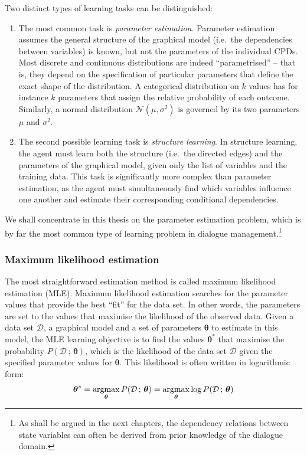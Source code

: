 Two distinct types of learning tasks can be distinguished:
\begin{enumerate}
\item The most common task is \textit{parameter estimation}.  Parameter estimation assumes the general structure of the graphical model (i.e.\ the dependencies between variables) is known, but not the parameters of the individual CPDs. Most discrete and continuous distributions are indeed ``parametrised'' -- that is, they depend on the specification of particular parameters that define the exact shape of the distribution. A categorical distribution on $k$ values has for instance $k$ parameters that assign the relative probability of each outcome.  Similarly, a normal distribution $\mathcal{N}(\mu,\sigma^2)$ is governed by its two parameters $\mu$ and $\sigma^2$. 

\item The second possible learning task is \textit{structure learning}.  In structure learning, the agent must learn both the structure (i.e.\ the directed edges) and the parameters of the graphical model, given only the list of variables and the training data.  This task is significantly more complex than parameter estimation, as the agent must simultaneously find which variables influence one another and estimate their corresponding conditional dependencies. 
\end{enumerate}

We shall concentrate in this thesis on the parameter estimation problem, which is by far the most common type of learning problem in dialogue management.\footnote{As shall be argued in the next chapters, the dependency relations between state variables can often be derived from prior knowledge of the dialogue domain.}

\subsubsection*{Maximum likelihood estimation}

The most straightforward estimation method is called maximum likelihood estimation (MLE). Maximum likelihood estimation searches for the parameter values that provide the best ``fit'' for the data set.  In other words, the parameters are set to the values that maximise the likelihood of the observed data.  Given a data set $\mathcal{D}$, a graphical model and a set of parameters $\boldsymbol\theta$ to estimate in this model, the MLE learning objective is to find the values $\boldsymbol\theta^*$  that maximise the probability $P(\mathcal{D} \, ;  \, \boldsymbol\theta)$, which is the likelihood of the data set $\mathcal{D}$ given the specified parameter values for $\boldsymbol\theta$. This likelihood is often written in logarithmic form: 
\begin{equation}
\boldsymbol\theta^* = \argmax_{\boldsymbol\theta} P(\mathcal{D}  \, ; \, \boldsymbol\theta) = \argmax_{\boldsymbol\theta} \log P(\mathcal{D}  \,  ;  \, \boldsymbol\theta)
\end{equation}

